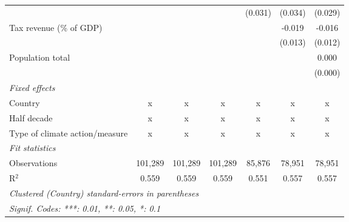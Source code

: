 \begin{tabular}{lcccccc}
                                                  &         &               &               & (0.031)       & (0.034)       & (0.029)\\   
   Tax revenue (\% of GDP)                        &         &               &               &               & -0.019        & -0.016\\   
                                                  &         &               &               &               & (0.013)       & (0.012)\\   
   Population total                               &         &               &               &               &               & 0.000\\   
                                                  &         &               &               &               &               & (0.000)\\   
   \emph{Fixed effects}\\
   Country                                        & x       & x             & x             & x             & x             & x\\  
   Half decade                                    & x       & x             & x             & x             & x             & x\\  
   Type of climate action/measure                 & x       & x             & x             & x             & x             & x\\  
   \midrule \emph{Fit statistics}\\
   Observations                                   & 101,289 & 101,289       & 101,289       & 85,876        & 78,951        & 78,951\\  
   R$^2$                                          & 0.559   & 0.559         & 0.559         & 0.551         & 0.557         & 0.557\\  
   \midrule
   \multicolumn{7}{l}{\emph{Clustered (Country) standard-errors in parentheses}}\\
   \multicolumn{7}{l}{\emph{Signif. Codes: ***: 0.01, **: 0.05, *: 0.1}}\\
\end{tabular}
\par\endgroup



